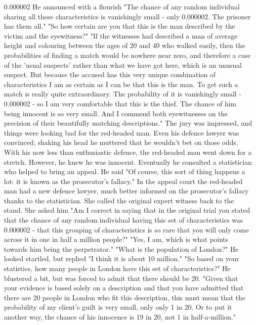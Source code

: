  0.000002 
He announced with a flourish "The chance of any random individual sharing all these characteristics is vanishingly small - only 0.000002. The prisoner has them all."
"So how certain are you that this is the man described by the victim and the eyewitness?"
"If the witnesses had described a man of average height and colouring between the ages of 20 and 40 who walked easily, then the probabilities of finding a match would be nowhere near zero, and therefore a case of the 'usual suspects' rather than what we have got here, which is an unusual suspect. But because the accused has this very unique combination of characteristics I am as certain as I can be that this is the man. To get such a match is really quite extraordinary. The probability of it is vanishingly small - 0.000002 - so I am very comfortable that this is the thief. The chance of him being innocent is so very small. And I commend both eyewitnesses on the precision of their beautifully matching descriptions."
The jury was impressed, and things were looking bad for the red-headed man. Even his defence lawyer was convinced; shaking his head he muttered that he wouldn't bet on those odds. With his now less than enthusiastic defence, the red-headed man went down for a stretch.
However, he knew he was innocent. Eventually he consulted a statistician who helped to bring an appeal. He said "Of course, this sort of thing happens a lot: it is known as the prosecutor's fallacy."
In the appeal court the red-headed man had a new defence lawyer, much better informed on the prosecutor's fallacy thanks to the statistician. She called the original expert witness back to the stand.
She asked him "Am I correct in saying that in the original trial you stated that the chance of any random individual having this set of characteristics was 0.000002 - that this grouping of characteristics is so rare that you will only come across it in one in half a million people?"
"Yes, I am, which is what points towards him being the perpetrator."
"What is the population of London?"
He looked startled, but replied "I think it is about 10 million."
"So based on your statistics, how many people in London have this set of characteristics?"
He blustered a bit, but was forced to admit that there should be 20.
"Given that your evidence is based solely on a description and that you have admitted that there are 20 people in London who fit this description, this must mean that the probability of my client's guilt is very small, only only 1 in 20. Or to put it another way, the chance of his innocence is 19 in 20, not 1 in half-a-million."
